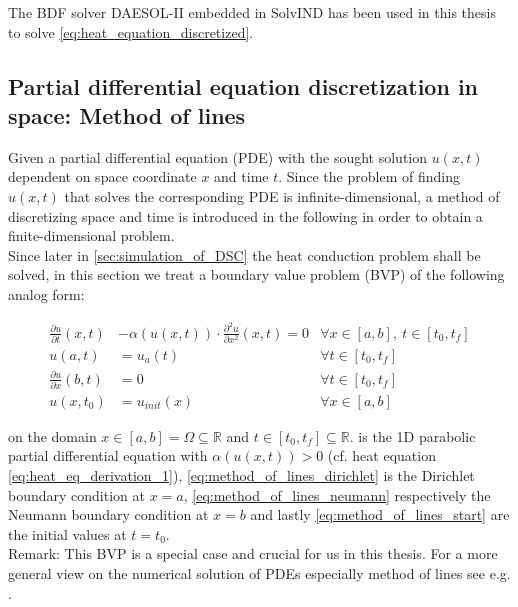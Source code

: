 \documentclass{scrartcl}[12pt, halfparskip]
\numberwithin{equation}{section}
\numberwithin{figure}{section}
\numberwithin{table}{section}
\begin{document}
The BDF solver DAESOL-II embedded in SolvIND has been used in this thesis to solve \cref{eq:heat_equation_discretized}.






\subsection{Partial differential equation discretization in space: Method of lines}
\label{sec:pde_discretization}


Given a partial differential equation (PDE) with the sought solution $u(x,t)$ dependent on space coordinate $x$ and time $t$. Since the problem of finding $u(x,t)$ that solves the corresponding PDE is infinite-dimensional, a method of discretizing space and time is introduced in the following in order to obtain a finite-dimensional problem. \\
Since later in \cref{sec:simulation_of_DSC} the heat conduction problem shall be solved, in this section we treat a boundary value problem (BVP) of the following analog form:

\begin{subequations}
	\begin{align}
	\frac{\partial u}{\partial t}(x,t) & - \alpha(u(x,t)) \cdot \frac{\partial^2 u}{\partial x^2}(x,t) = 0 & \forall x \in [a,b], \ t \in [t_0,t_f] \label{eq:method_of_lines_pde} \\
	u(a,t) & = u_a(t)  & \forall t \in [t_0,t_f] \label{eq:method_of_lines_dirichlet} \\
	\frac{\partial u}{\partial x}(b,t) & = 0  & \forall t \in [t_0,t_f] \label{eq:method_of_lines_neumann}  \\
	u(x,t_0) & = u_{init}(x) & \forall x \in [a,b] \label{eq:method_of_lines_start}
	\end{align}
	\label{eq:method_of_lines}
\end{subequations}

on the domain $x \in [a,b] = \Omega \subseteq \mathbb{R}$ and $t \in [t_0,t_f] \subseteq \mathbb{R}$.  is the 1D parabolic partial differential equation with $\alpha(u(x,t)) > 0$ (cf. heat equation \eqref{eq:heat_eq_derivation_1}), \cref{eq:method_of_lines_dirichlet} is the Dirichlet boundary condition at $x=a$, \cref{eq:method_of_lines_neumann} respectively the Neumann boundary condition at $x=b$ and lastly \cref{eq:method_of_lines_start} are the initial values at ${t=t_0}$. \\
Remark: This BVP is a special case and crucial for us in this thesis. For a more general view on the numerical solution of PDEs especially method of lines see e.g. \cite{pde_buch_solin}. \\
\end{document}
